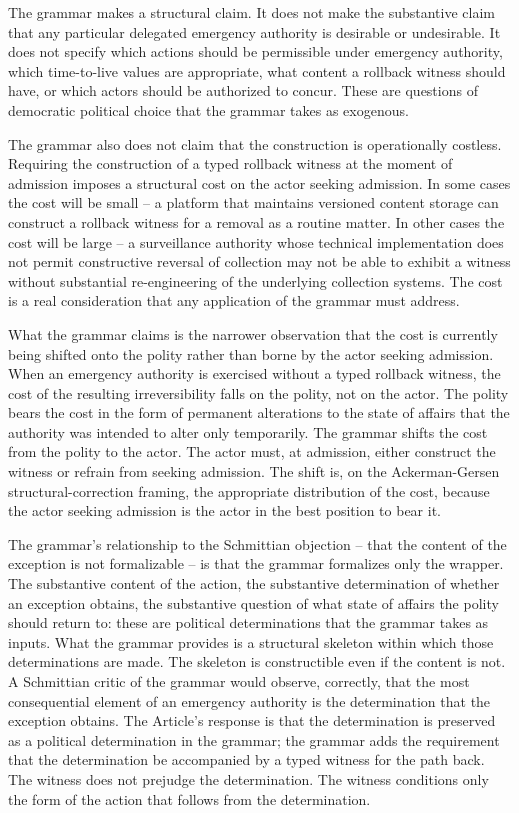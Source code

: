 The grammar makes a structural claim.
It does not make the substantive claim that any particular delegated emergency authority is desirable or undesirable.
It does not specify which actions should be permissible under emergency authority,
which time-to-live values are appropriate, what content a rollback witness should have, or which actors should
be authorized to concur.
These are questions of democratic political choice that the grammar takes as exogenous.

The grammar also does not claim that the construction is operationally costless.
Requiring the construction of a typed rollback witness at the moment of admission imposes a structural cost
on the actor seeking admission.
In some cases the cost will be small -- a platform that maintains versioned content storage can construct
a rollback witness for a removal as a routine matter.
In other cases the cost will be large -- a surveillance authority whose technical implementation does not
permit constructive reversal of collection may not be able to exhibit a witness without substantial re-engineering
of the underlying collection systems.
The cost is a real consideration that any application of the grammar must address.

What the grammar claims is the narrower observation that the cost is currently being shifted onto the polity
rather than borne by the actor seeking admission.
When an emergency authority is exercised without a typed rollback witness,
the cost of the resulting irreversibility falls on the polity, not on the actor.
The polity bears the cost in the form of permanent alterations to the state of affairs that the authority was
intended to alter only temporarily.
The grammar shifts the cost from the polity to the actor.
The actor must, at admission, either construct the witness or refrain from seeking admission.
The shift is, on the Ackerman-Gersen structural-correction framing, the appropriate distribution of the cost,
because the actor seeking admission is the actor in the best position to bear it.

The grammar's relationship to the Schmittian objection -- that the content of the exception is not formalizable --
is that the grammar formalizes only the wrapper.
The substantive content of the action, the substantive determination of whether an exception obtains,
the substantive question of what state of affairs the polity should return to: these are political determinations
that the grammar takes as inputs.
What the grammar provides is a structural skeleton within which those determinations are made.
The skeleton is constructible even if the content is not.
A Schmittian critic of the grammar would observe, correctly, that the most consequential element of an emergency
authority is the determination that the exception obtains.
The Article's response is that the determination is preserved as a political determination in the grammar;
the grammar adds the requirement that the determination be accompanied by a typed witness for the path back.
The witness does not prejudge the determination.
The witness conditions only the form of the action that follows from the determination.
